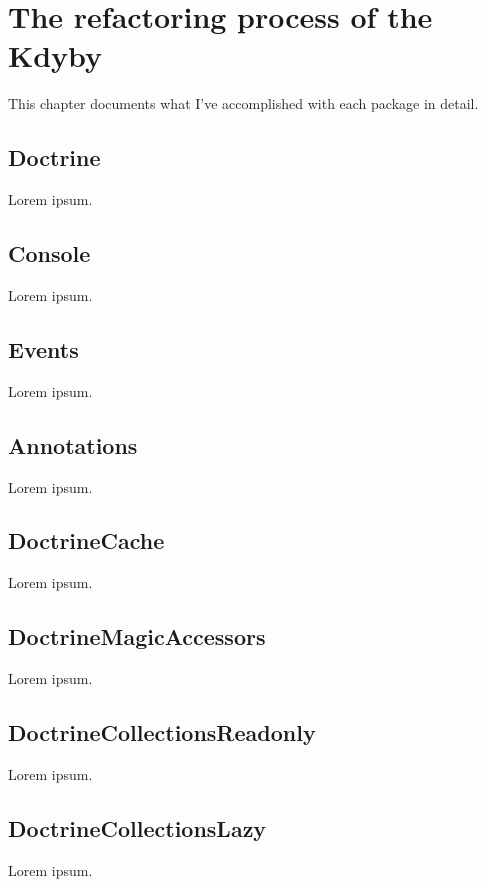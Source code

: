\chapter{The refactoring process of the Kdyby}

This chapter documents what I've accomplished with each package in detail.

\section{Doctrine}

Lorem ipsum.

\section{Console}

Lorem ipsum.

\section{Events}

Lorem ipsum.

\section{Annotations}

Lorem ipsum.

\section{DoctrineCache}

Lorem ipsum.

\section{DoctrineMagicAccessors}

Lorem ipsum.

\section{DoctrineCollectionsReadonly}

Lorem ipsum.

\section{DoctrineCollectionsLazy}

Lorem ipsum.

